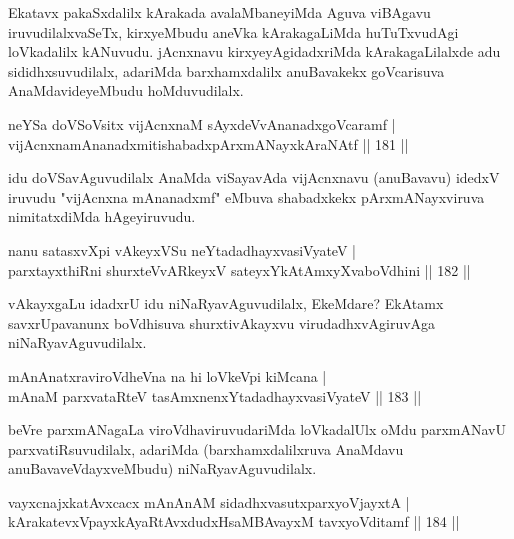 \begin{artha}%
Ekatavx pakaSxdalilx kArakada avalaMbaneyiMda Aguva viBAgavu iruvudilalxvaSeTx, kirxyeMbudu aneVka kArakagaLiMda huTuTxvudAgi loVkadalilx kANuvudu. jAcnxnavu kirxyeyAgidadxriMda kArakagaLilalxde adu sididhxsuvudilalx, adariMda barxhamxdalilx anuBavakekx goVcarisuva AnaMdavideyeMbudu hoMduvudilalx.
\end{artha}


\begin{shl}
neYSa doVSoV\s sitx vijAcnxnaM sAyxdeVvA\s \s nanadxgoVcaramf |\\
vijAcnxnamAnanadxmitishabadxpArxmANayxkAraNAtf \hfill || 181 ||
\end{shl}

\begin{artha}
idu doVSavAguvudilalx AnaMda viSayavAda vijAcnxnavu (anuBavavu) idedxV iruvudu "vijAcnxna mAnanadxmf" eMbuva shabadxkekx pArxmANayxviruva nimitatxdiMda hAgeyiruvudu.
\end{artha}


\begin{shl}
nanu satasxvXpi vAkeyxVSu neYtadadhayxvasiVyateV |\\
parxtayxthiRni shurxteVvARkeyxV sateyxYkAtAmxyXvaboVdhini \hfill || 182 ||
\end{shl}

\begin{artha}
vAkayxgaLu idadxrU idu niNaRyavAguvudilalx, EkeMdare? EkAtamx savxrUpavanunx boVdhisuva shurxtivAkayxvu virudadhxvAgiruvAga niNaRyavAguvudilalx.
\end{artha}

\begin{shl}
mAnAnatxraviroVdheVna na hi loVkeV\s pi kiMcana |\\
mAnaM parxvataRteV tasAmxnenxYtadadhayxvasiVyateV \hfill || 183 ||
\end{shl}

\begin{artha}
beVre parxmANagaLa viroVdhaviruvudariMda loVkadalUlx oMdu parxmANavU parxvatiRsuvudilalx, adariMda (barxhamxdalilxruva AnaMdavu anuBavaveVdayxveMbudu) niNaRyavAguvudilalx. 
\end{artha}

\begin{shl}
vayxcnajxkatAvxcacx mAnAnAM sidadhxvasutxparxyoVjayxtA |\\
kArakatevxV\s payxkAyaRtAvxdudxHsaMBAvayxM tavxyoVditamf \hfill || 184 ||
\end{shl}

